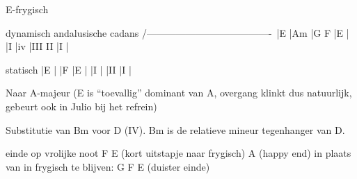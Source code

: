 E-frygisch

 dynamisch   		 andalusische cadans
/--------------------\/-------------------\
|E		|Am		|G 	F	|E		|
|I		|iv		|III	II	|I		|

statisch
|E	|	|F	|E	|
|I	|	|II	|I	|

Naar A-majeur (E is “toevallig” dominant van A, overgang klinkt dus natuurlijk, gebeurt ook in Julio bij het refrein)

Substitutie van Bm voor D (IV). Bm is de relatieve mineur tegenhanger van D.

einde op vrolijke noot F E (kort uitstapje naar frygisch) A (happy end) in plaats van in frygisch te blijven: G F E (duister einde)
